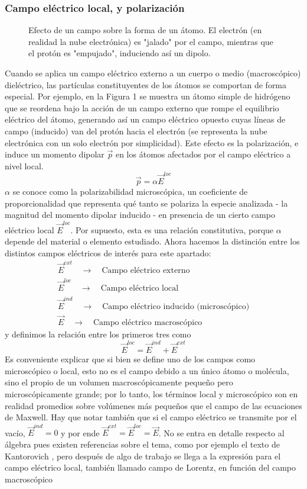 \documentclass[12pt, notitlepage]{article}
\begin{document}
\subsubsection{Campo eléctrico local, y polarización}
\begin{figure}[H]
\centering

\caption{Efecto de un campo sobre la forma de un átomo. El electrón (en realidad la nube electrónica) es "jalado" por el campo, mientras que el protón es "empujado", induciendo así un dipolo.}
\end{figure}
Cuando se aplica un campo eléctrico externo a un cuerpo o medio (macroscópico) dieléctrico, las partículas constituyentes de los átomos se comportan de forma especial. Por ejemplo, en la Figura 1 se muestra un átomo simple de hidrógeno que se reordena bajo la acción de un campo externo que rompe el equilibrio eléctrico del átomo, generando así un campo eléctrico opuesto cuyas líneas de campo (inducido) van del protón hacia el electrón (se representa la nube electrónica con un solo electrón por simplicidad). Este efecto es la polarización, e induce un momento dipolar $\vec{p}$ en los átomos afectados por el campo eléctrico a nivel local.
\begin{equation}
\vec{p} = \alpha\vec{E}^{loc}
\end{equation}
$\alpha$ se conoce como la polarizabilidad microscópica, un coeficiente de proporcionalidad que representa qué tanto se polariza la especie analizada - la magnitud del momento dipolar inducido - en presencia de un cierto campo eléctrico local $\vec{E}^{loc}$. Por supuesto, esta es una relación constitutiva, porque $\alpha$ depende del material o elemento estudiado. Ahora hacemos la distinción entre los distintos campos eléctricos de interés para este apartado:
\begin{gather*}
\vec{E}^{ext} \quad \longrightarrow \quad \text{Campo eléctrico externo}\\
\vec{E}^{loc} \quad \longrightarrow \quad \text{Campo eléctrico local}\\
\vec{E}^{ind} \quad \longrightarrow \quad \text{Campo eléctrico inducido (microscópico)}\\
\vec{E} \quad \longrightarrow \quad \text{Campo eléctrico macroscópico}
\end{gather*}
y definimos la relación entre los primeros tres como
\begin{equation}
\vec{E}^{loc} = \vec{E}^{ind} + \vec{E}^{ext}
\end{equation}
Es conveniente explicar que si bien se define uno de los campos como microscópico o local, esto no es el campo debido a un único átomo o molécula, sino el propio de un volumen macroscópicamente pequeño pero microscópicamente grande; por lo tanto, los términos local y microscópico son en realidad promedios sobre volúmenes más pequeños que el campo de las ecuaciones de Maxwell. Hay que notar también que si el campo eléctrico se transmite por el vacío, $\vec{E}^{ind} = 0$ y por ende $\vec{E}^{ext} = \vec{E}^{loc} = \vec{E}$. No se entra en detalle respecto al álgebra pues existen referencias sobre el tema, como por ejemplo el texto de Kantorovich \cite{Kantorovich}, pero después de algo de trabajo se llega a la expresión para el campo eléctrico local, también llamado campo de Lorentz, en función del campo macroscópico
\end{document}

